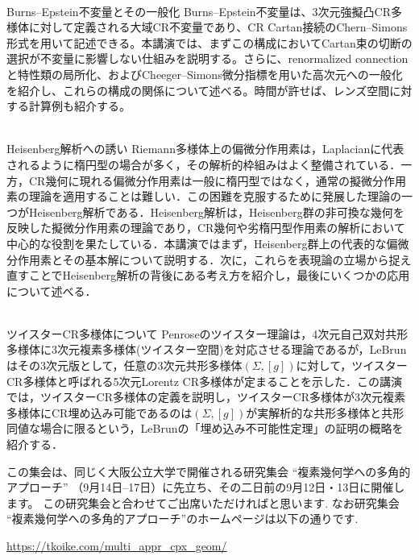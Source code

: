 \documentclass[dvipdfmx,a4paper,12pt]{article}
\theoremstyle{plain} %
\theoremstyle{definition} %
\begin{document}
\vskip5mm

\\
Burns--Epstein不変量とその一般化
\vskip3mm
Burns--Epstein不変量は、3次元強擬凸CR多様体に対して定義される大域CR不変量であり、CR Cartan接続のChern--Simons形式を用いて記述できる。本講演では、まずこの構成においてCartan束の切断の選択が不変量に影響しない仕組みを説明する。さらに、renormalized connectionと特性類の局所化、およびCheeger--Simons微分指標を用いた高次元への一般化を紹介し、これらの構成の関係について述べる。時間が許せば、レンズ空間に対する計算例も紹介する。
\vskip8mm

\\
Heisenberg解析への誘い
\vskip3mm
Riemann多様体上の偏微分作用素は，Laplacianに代表されるように楕円型の場合が多く，その解析的枠組みはよく整備されている．一方，CR幾何に現れる偏微分作用素は一般に楕円型ではなく，通常の擬微分作用素の理論を適用することは難しい．この困難を克服するために発展した理論の一つがHeisenberg解析である．Heisenberg解析は，Heisenberg群の非可換な幾何を反映した擬微分作用素の理論であり，CR幾何や劣楕円型作用素の解析において中心的な役割を果たしている．本講演ではまず，Heisenberg群上の代表的な偏微分作用素とその基本解について説明する．次に，これらを表現論の立場から捉え直すことでHeisenberg解析の背後にある考え方を紹介し，最後にいくつかの応用について述べる．
\vskip8mm


\newpage

\\
ツイスターCR多様体について 
\vskip3mm
Penroseのツイスター理論は，4次元自己双対共形多様体に3次元複素多様体(ツイスター空間)を対応させる理論であるが，LeBrunはその3次元版として，任意の3次元共形多様体$(\Sigma, [g])$に対して，ツイスターCR多様体と呼ばれる5次元Lorentz CR多様体が定まることを示した．この講演では，ツイスターCR多様体の定義を説明し，ツイスターCR多様体が3次元複素多様体にCR埋め込み可能であるのは$(\Sigma, [g])$が実解析的な共形多様体と共形同値な場合に限るという，LeBrunの「埋め込み不可能性定理」の証明の概略を紹介する． 
\vskip8mm

\vskip5mm

この集会は、同じく大阪公立大学で開催される研究集会
``複素幾何学への多角的アプローチ''
（9月14日--17日）に先立ち、その二日前の9月12日・13日に開催します。
この研究集会と合わせてご出席いただければと思います. 
なお研究集会 ``複素幾何学への多角的アプローチ''のホームページは以下の通りです.
\begin{center}
\url{https://tkoike.com/multi_appr_cpx_geom/}
\end{center}
\vskip5mm
\end{document}
